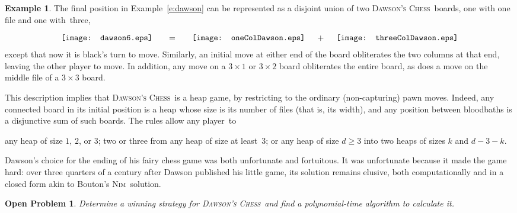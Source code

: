 \documentclass[12pt]{amsart}
\numberwithin{equation}{section}
\newtheorem{prob}[thm]{Open Problem}
\theoremstyle{definition}
\newtheorem{example}[thm]{Example}
\begin{document}
\begin{example}\label{e:dawson1+3}
The final position in Example~\ref{e:dawson} can be represented as a
disjoint union of two {\textsc{Dawson's Chess}}\ boards, one with one file and one
with~three,
$$\begin{array}{rcl}
\\[-2ex]
\begin{array}{@{}c@{}}\texttt{[image: dawson6.eps]}\end{array}
&\quad=\quad&
\begin{array}{@{}c@{}}\texttt{[image: oneColDawson.eps]}\end{array}
\quad\; + \;\quad
\begin{array}{@{}c@{}}\texttt{[image: threeColDawson.eps]}\end{array}
\end{array}
$$
except that now it is black's turn to move.  Similarly, an initial
move at either end of the board obliterates the two columns at that
end, leaving the other player to move.  In addition, any move on a $3
\times 1$ or $3 \times 2$ board obliterates the entire board, as does
a move on the middle file of a $3 \times 3$ board.

This description implies that {\textsc{Dawson's Chess}}\ is a heap game, by restricting
to the ordinary (non-capturing) pawn moves.  Indeed, any connected
board in its initial position is a heap whose size is its number of
files (that is, its width), and any position between bloodbaths is a
disjunctive sum of such boards.  The rules allow any player~to
\begin{itemize}
\itemeliminate any heap of size $1$, $2$, or $3$;
\itemtake two or three from any heap of size at least~$3$; or
\itemsplit any heap of size $d \geq 3$ into two heaps of sizes $k$ and
$d-3-k$.
\end{itemize}
\end{example}

Dawson's choice for the ending of his fairy chess game was both
unfortunate and fortuitous.  It was unfortunate because it made the
game hard: over three quarters of a century after Dawson published his
little game, its solution remains elusive, both computationally and in
a closed form akin to Bouton's {\textsc{Nim}}\ solution.

\begin{prob}\label{o:dawson}
Determine a winning strategy for {\textsc{Dawson's Chess}}\ and find a polynomial-time
algorithm to calculate it.
\end{prob}
\end{document}
